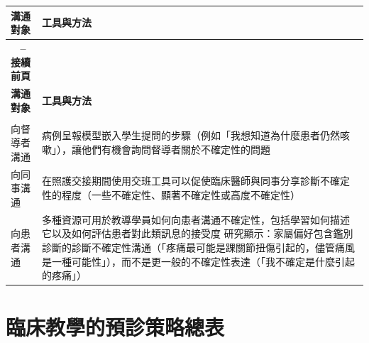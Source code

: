 \documentclass[12pt,a4paper]{article}
\begin{document}
\begin{longtable}{>{\raggedright\arraybackslash}p{4cm} >{\raggedright\arraybackslash}p{11cm}}
\toprule
\textbf{\textcolor{emergency_blue}{溝通對象}} & \textbf{\textcolor{emergency_blue}{工具與方法}} \\
\midrule
\endfirsthead

\multicolumn{2}{c}%
{{\bfseries \tablename\ \thetable{} -- 接續前頁}} \\
\toprule
\textbf{\textcolor{emergency_blue}{溝通對象}} & \textbf{\textcolor{emergency_blue}{工具與方法}} \\
\midrule
\endhead

\midrule \multicolumn{2}{r}{{接續下頁}} \\ \midrule
\endfoot

\bottomrule
\endlastfoot

\textcolor{emergency_red}{向督導者溝通} & 病例呈報模型嵌入學生提問的步驟（例如「我想知道為什麼患者仍然咳嗽」），讓他們有機會詢問督導者關於不確定性的問題 \\

\textcolor{emergency_red}{向同事溝通} & 在照護交接期間使用交班工具可以促使臨床醫師與同事分享診斷不確定性的程度（一些不確定性、顯著不確定性或高度不確定性） \\

\textcolor{emergency_red}{向患者溝通} & 多種資源可用於教導學員如何向患者溝通不確定性，包括學習如何描述它以及如何評估患者對此類訊息的接受度 \newline 研究顯示：家屬偏好包含鑑別診斷的診斷不確定性溝通（「疼痛最可能是踝關節扭傷引起的，儘管痛風是一種可能性」），而不是更一般的不確定性表達（「我不確定是什麼引起的疼痛」） \\
\end{longtable}

\section{臨床教學的預診策略總表}
\end{document}

